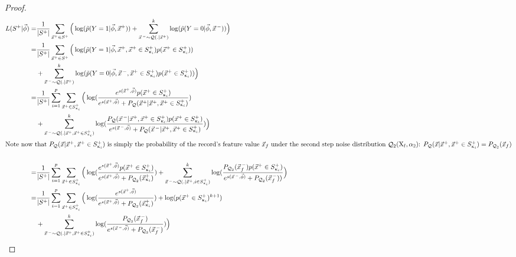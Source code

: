 \documentclass{article} %
\newcommand{\vect}[1]{\vec{#1}}
\DeclareMathOperator{\q}{{\mathcal{Q}}}
\begin{document}
\begin{proof}
\begin{align*}
 L(S^+ | \vec{\phi} )  =&   \frac{1}{|S^+|} \sum_{\vect{x}^+ \in S^+} \Big(\log(\tilde p(Y=1|\vec{\phi},\vect{x}^+  ) ) + \sum_{\vect{x}^{\,-}\sim \q(.|\vect{x}^+)}^k \log(\tilde p(Y=0|\vec{\phi},\vect{x}^{\,-})) \Big) \\
  =&  \frac{1}{|S^+|} \sum_{\vect{x}^+ \in S^+} \Big( \log(\tilde p(Y=1|\vec{\phi},\vect{x}^+, \vect{x}^+ \in S^+_{\upkappa_i} )p(\vect{x}^+ \in S^+_{\upkappa_i}) ) \\ &
   + \sum_{\vect{x}^{\,-} \sim \q(.|\vect{x}^+)}^k \log(\tilde p(Y=0|\vec{\phi},\vect{x}^{\,-},\vect{x}^+ \in S^+_{\upkappa_i})p(\vect{x}^+ \in S^+_{\upkappa_i})) \Big) \\
  =&  \frac{1}{|S^+|}\sum_{i=1}^p \sum_{\vect{x}^+ \in S^+_{\upkappa_i}} \Big( \log(\frac{e^{s(\vect{x}^+,\vec{\phi}) } p(\vect{x}^+ \in S^+_{\upkappa_i})}{e^{s(\vect{x}^+,\vec{\phi}) } + P_{\q}(\vect{x}^+ |\vect{x}^+, \vect{x}^+ \in S^+_{\upkappa_i}) }) \\ &
  +  \sum_{\vect{x}^{\,-} \sim \q(.|\vect{x}^+,\vect{x}^+ \in S^+_{\upkappa_i})}^k \log(\frac{ P_{\q}(\vect{x}^{\,-} |\vect{x}^+, \vect{x}^+ \in S^+_{\upkappa_i})p(\vect{x}^+ \in S^+_{\upkappa_i})}{e^{s(\vect{x}^{\,-},\vec{\phi}) } + P_{\q}(\vect{x}^{\,-}|\vect{x}^+, \vect{x}^+ \in S^+_{\upkappa_i})}) \Big) \\
  \intertext{Note now that $P_{\q}(\vect{x}|\vect{x}^+,\vect{x}^+ \in S^+_{\upkappa_i})$ is simply the probability of the record's feature value $\vect{x}_{f}$ under the second step noise distribution $\q_2(\mathrm{X_{f}},\alpha_2)$:
   $P_{\q}(\vect{x}|\vect{x}^+,\vect{x}^+ \in S^+_{\upkappa_i}) = P_{\q_2}(\vect{x}_{f})$}\\
=&  \frac{1}{|S^+|}\sum_{i=1}^p \sum_{\vect{x}^+ \in S^+_{\upkappa_i}} \Big( \log(\frac{e^{s(\vect{x}^+,\vec{\phi}) } p(\vect{x}^+ \in S^+_{\upkappa_i})}{e^{s(\vect{x}^+,\vec{\phi}) } + P_{\q_2}(\vect{x}^+_{\upkappa_i}) } ) + \sum_{\vect{x}^{\,-} \sim \q(.|\vect{x}^+,i\in S^+_{\upkappa_i})}^k \log(\frac{  P_{\q_2}(\vect{x}^{\,-}_{f})p(\vect{x}^+ \in S^+_{\upkappa_i})}{e^{s(\vect{x}^{\,-},\vec{\phi}) } + P_{\q_2}(\vect{x}^{\,-}_{f})) } \Big) \\
   = & \frac{1}{|S^+|}\sum_{i=1}^p \sum_{\vect{x}^+ \in S^+_{\upkappa_i}} \Big( \log(\frac{e^{s(\vect{x}^+,\vec{\phi}) }}{e^{s(\vect{x}^+,\vec{\phi}) } + P_{\q_2}(\vect{x}^+_{\upkappa_i}) }) + \log(p(\vect{x}^+ \in S^+_{\upkappa_i})^{k+1})\\
  &   +  \sum_{\vect{x}^{\,-} \sim \q(.|\vect{x}^+,\vect{x}^+ \in S^+_{\upkappa_i})}^k \log(\frac{ P_{\q_2}(\vect{x}^{\,-}_{f})}{e^{s(\vect{x}^{\,-},\vec{\phi}) } + P_{\q_2}(\vect{x}^{\,-}_{f})})   \Big) \\

\end{align*}
\end{proof}
\end{document}

